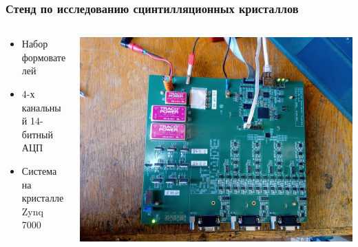 \documentclass[aspectratio=169]{beamer}
\begin{document}
\begin{frame}
\frametitle{Стенд по исследованию сцинтилляционных кристаллов}
    \begin{columns}
        \begin{column}{0.4\textwidth}
            \begin{itemize}
                \item Набор формователей 
                \item 4-х канальный 14-битный АЦП
                \item Система на кристалле Zynq 7000
            \end{itemize}
        \end{column}
        \begin{column}{0.6\textwidth}
            \includegraphics[width=\textwidth]{board.jpg}
        \end{column}
    \end{columns}
\end{frame}
\end{document}
